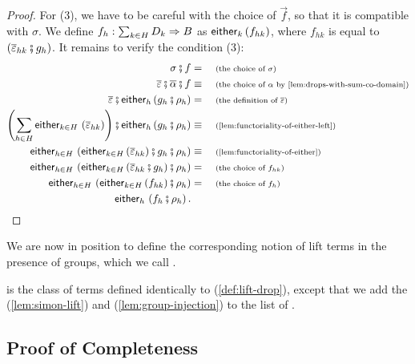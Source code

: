 \begin{proof}
    For (3), we have to be careful with the choice of $\vec f$, so that it is compatible with $\sigma$. We define $f_h : \sum_{k \in H} D_k \Rightarrow B$ as $\mathsf{either}_{k}\, (f_{h k})$, where $f_{h k}$ is equal to $(\inv \varepsilon_{h k} \comp g_h)$. It remains to verify the condition (3):
    \begin{align*}
        \sigma \comp f &= \why{the choice of $\sigma$} \\ 
        \inv \varepsilon \comp \inv \alpha \comp f \equalbecause{the choice of $\alpha$ by \cref{lem:drops-with-sum-co-domain}} \\ 
        \inv \varepsilon \comp \eithermany{h}{(g_h \comp \rho_h)} &= \why{the definition of $\inv \varepsilon$} \\
        \left( \sum_{h \in H} \eithermany{k \in H}{\left( \inv \varepsilon_{h k} \right)} \right) \comp \eithermany{h}{(g_h \comp \rho_h)} \equalbecause{\cref{lem:functoriality-of-either-left}} \\ 
        \eithermany{h \in H}{\left( \eithermany{k \in H}{(\inv \varepsilon_{h k})} \comp g_h \comp \rho_h \right)} \equalbecause{\cref{lem:functoriality-of-either}} \\ 
        \eithermany{h \in H}{\left( \eithermany{k \in H}{(\inv \varepsilon_{h k} \comp g_h)} \comp \rho_h \right)} &= \why{the choice of $f_{h k}$} \\ 
        \eithermany{h \in H}{\left( \eithermany{k \in H}{(f_{h k})} \comp \rho_h \right)} &=  \why{the choice of $f_h$} \\ 
        \eithermany{h}{\left( f_h \comp \rho_h \right)}.
    \end{align*}
\end{proof}

We are now in position to define the corresponding notion of lift terms in the presence of groups, which we call .

\begin{definition}\label{def:group-lifts}
     is the class of terms defined identically to  (\cref{def:lift-drop}), except that we add the  (\cref{lem:simon-lift}) and  (\cref{lem:group-injection}) to the list of .
\end{definition}

\subsection{Proof of Completeness}


